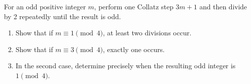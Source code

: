 For an odd positive integer $m$, perform one Collatz step $3m+1$ and then divide by 2 repeatedly until the result is odd.\begin{enumerate}\item Show that if $m\equiv1\pmod4$, at least two divisions occur.\item Show that if $m\equiv3\pmod4$, exactly one occurs.\item In the second case, determine precisely when the resulting odd integer is $1\pmod4$.\end{enumerate}
